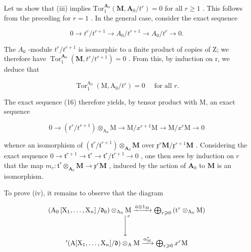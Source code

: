 Let us show that (iii) implies \(\mathrm{Tor}_{1}^{\mathbf{A}_{0}}(\mathbf{M},\mathbf{A}_{0}/t^{r})=0\) for all \(r\geqslant1\) . This follows from the preceding for \(r=1\) . In the general case, consider the exact sequence

\[
0 \rightarrow t ^ {r} / t ^ {r + 1} \rightarrow A _ {0} / t ^ {r + 1} \rightarrow A _ {0} / t ^ {r} \rightarrow 0.\tag{16}
\]

The \(A_{0}\) -module \(t^{r}/t^{r+1}\) is isomorphic to a finite product of copies of Z; we therefore have \(\operatorname{Tor}_{1}^{\mathbf{A}_{0}}(\mathbf{M}, t^{r}/t^{r+1}) = 0\) . From this, by induction on r, we deduce that

\[
\operatorname{Tor} _ {1} ^ {\mathrm{A} _ {0}} \left(\mathrm{M}, \mathrm{A} _ {0} / t ^ {r}\right) = 0 \quad \text { for   all } r.
\]

The exact sequence (16) therefore yields, by tensor product with M, an exact sequence

\[
0 \rightarrow (t ^ {r} / t ^ {r + 1}) \otimes_ {\mathrm{A} _ {0}} \mathrm{M} \rightarrow \mathrm{M} / x ^ {r + 1} \mathrm{M} \rightarrow \mathrm{M} / x ^ {r} \mathrm{M} \rightarrow 0\tag{17}
\]

whence an isomorphism of \((\mathfrak{t}^r /\mathfrak{t}^{r + 1})\otimes_{\mathbf{A}_0}\mathbf{M}\) over \(\mathfrak{x}^r\mathbf{M} / \mathfrak{x}^{r + 1}\mathbf{M}\) . Considering the exact sequence \(0\to \mathfrak{t}^{r + 1}\to \mathfrak{t}^r\to \mathfrak{t}^r /\mathfrak{t}^{r + 1}\to 0\) , one then sees by induction on \(r\) that the map \(m_r:\mathfrak{t}^r\otimes_{\mathbf{A}_0}\mathbf{M}\rightarrow \mathfrak{x}^r\mathbf{M}\) , induced by the action of \(\mathbf{A}_0\) to \(\mathbf{M}\) is an isomorphism.

To prove (iv), it remains to observe that the diagram

\[
\begin{array}{c} \left(\mathrm{A} _ {0} \left[ \mathrm{X} _ {1}, \dots , \mathrm{X} _ {n} \right] / \mathfrak {d} _ {0}\right) \otimes_ {\mathrm{A} _ {0}} \mathrm{M} \xrightarrow {\bar {u} \otimes 1 _ {\mathrm{M}}} \bigoplus_ {r \geqslant 0} \left(\mathrm{t} ^ {r} \otimes_ {\mathrm{A} _ {0}} \mathrm{M}\right) \\ \Bigg \downarrow^ {e} \\ ^ {\prime} (\mathrm{A} [ \mathrm{X} _ {1}, \dots , \mathrm{X} _ {n} ] / \mathfrak {d}) \otimes_ {\mathrm{A}} \mathrm{M} \xrightarrow {\alpha_ {\mathrm{M}} ^ {*}} \bigoplus_ {r \geqslant 0} x ^ {r} \mathrm{M} \end{array}
\]


